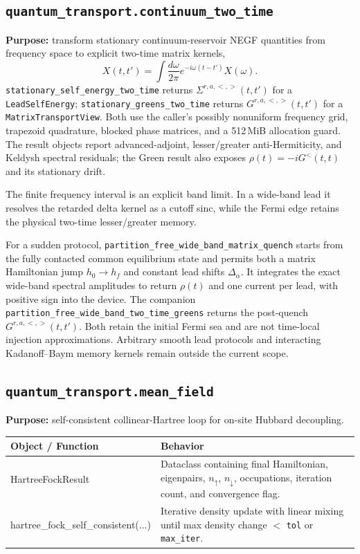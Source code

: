 \documentclass[11pt,a4paper]{article}
\begin{document}
\subsection{\texttt{quantum\_transport.continuum\_two\_time}}
\textbf{Purpose:} transform stationary continuum-reservoir NEGF quantities from
frequency space to explicit two-time matrix kernels,
\begin{equation}
  X(t,t')=\int\frac{d\omega}{2\pi}
  e^{-i\omega(t-t')}X(\omega).
\end{equation}
\texttt{stationary\_self\_energy\_two\_time} returns
$\Sigma^{r,a,<,>}(t,t')$ for a \texttt{LeadSelfEnergy};
\texttt{stationary\_greens\_two\_time} returns $G^{r,a,<,>}(t,t')$ for a
\texttt{MatrixTransportView}. Both use the caller's possibly nonuniform
frequency grid, trapezoid quadrature, blocked phase matrices, and a 512\,MiB
allocation guard. The result objects report advanced-adjoint,
lesser/greater anti-Hermiticity, and Keldysh spectral residuals; the Green
result also exposes $\rho(t)=-iG^<(t,t)$ and its stationary drift.

The finite frequency interval is an explicit band limit. In a wide-band lead
it resolves the retarded delta kernel as a cutoff sinc, while the Fermi edge
retains the physical two-time lesser/greater memory.

For a sudden protocol, \texttt{partition\_free\_wide\_band\_matrix\_quench}
starts from the fully contacted common equilibrium state and permits both a
matrix Hamiltonian jump $h_0\to h_f$ and constant lead shifts
$\Delta_\alpha$. It integrates the exact wide-band spectral amplitudes to
return $\rho(t)$ and one current per lead, with positive sign into the device.
The companion \texttt{partition\_free\_wide\_band\_two\_time\_greens} returns
the post-quench $G^{r,a,<,>}(t,t')$. Both retain the initial Fermi sea and are
not time-local injection approximations. Arbitrary smooth lead protocols and
interacting Kadanoff--Baym memory kernels remain outside the current scope.

\subsection{\texttt{quantum\_transport.mean\_field}}
\textbf{Purpose:} self-consistent collinear-Hartree loop for on-site Hubbard decoupling.

\begin{longtable}{>{\ttfamily}p{} p{}}
\toprule
Object / Function & Behavior \\
\midrule
\endhead
HartreeFockResult & Dataclass containing final Hamiltonian, eigenpairs, \(n_\uparrow\), \(n_\downarrow\), occupations, iteration count, and convergence flag. \\
hartree\_fock\_self\_consistent(...) & Iterative density update with linear mixing until max density change \(<\) \texttt{tol} or \texttt{max\_iter}. \\
\bottomrule
\end{longtable}
\end{document}
